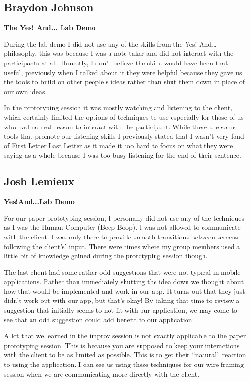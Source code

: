 \documentclass[12pt,letterpaper]{article}
\begin{document}
\clearpage
\subsection{Braydon Johnson}
\textbf{The Yes! And... Lab Demo}\par
During the lab demo I did not use any of the skills from the Yes! And… philosophy, this was because I was a note taker and did not interact with the participants at all. Honestly, I don’t believe the skills would have been that useful, previously when I talked about it they were helpful because they gave us the tools to build on other people’s ideas rather than shut them down in place of our own ideas.\par
In the prototyping session it was mostly watching and listening to the client, which certainly limited the options of techniques to use especially for those of us who had no real reason to interact with the participant. While there are some tools that promote our listening skills I previously stated that I wasn’t very fond of First Letter Last Letter as it made it too hard to focus on what they were saying as a whole because I was too busy listening for the end of their sentence. 

\clearpage
\subsection{Josh Lemieux}
\textbf{Yes!And...Lab Demo}\par
For our paper prototyping session, I personally did not use any of the techniques as I was the Human Computer (Beep Boop). I was not allowed to communicate with the client. I was only there to provide smooth transitions between screens following the client's’ input. There were times where my group members used a little bit of knowledge gained during the prototyping session though.\par
	The last client had some rather odd suggestions that were not typical in mobile applications. Rather than immediately shutting the idea down we thought about how that would be implemented and work in our app. It turns out that they just didn’t work out with our app, but that’s okay! By taking that time to review a suggestion that initially seems to not fit with our application, we may come to see that an odd suggestion could add benefit to our application.\par
      	A lot that we learned in the improv session is not exactly applicable to the paper prototyping session. This is because you are supposed to keep your interactions with the client to be as limited as possible. This is to get their “natural” reaction to using the application. I can see us using these techniques for our wire framing session when we are communicating more directly with the client.
\end{document}
